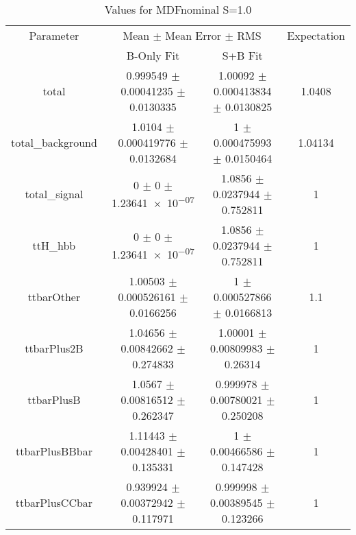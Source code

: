 \begin{table}
\centering
\caption{Values for MDFnominal S=1.0}
\begin{tabular}{cccc}
\toprule
Parameter & \multicolumn{2}{c}{Mean $\pm$ Mean Error $\pm$ RMS} & Expectation\\
 & B-Only Fit & S+B Fit & \\
\midrule
total & \num{0.999549} $\pm$ \num{0.00041235} $\pm$ \num{0.0130335} & \num{1.00092} $\pm$ \num{0.000413834} $\pm$ \num{0.0130825} & \num{1.0408}\\
total\_background & \num{1.0104} $\pm$ \num{0.000419776} $\pm$ \num{0.0132684} & \num{1} $\pm$ \num{0.000475993} $\pm$ \num{0.0150464} & \num{1.04134}\\
total\_signal & \num{0} $\pm$ \num{0} $\pm$ \num{1.23641e-07} & \num{1.0856} $\pm$ \num{0.0237944} $\pm$ \num{0.752811} & \num{1}\\
ttH\_hbb & \num{0} $\pm$ \num{0} $\pm$ \num{1.23641e-07} & \num{1.0856} $\pm$ \num{0.0237944} $\pm$ \num{0.752811} & \num{1}\\
ttbarOther & \num{1.00503} $\pm$ \num{0.000526161} $\pm$ \num{0.0166256} & \num{1} $\pm$ \num{0.000527866} $\pm$ \num{0.0166813} & \num{1.1}\\
ttbarPlus2B & \num{1.04656} $\pm$ \num{0.00842662} $\pm$ \num{0.274833} & \num{1.00001} $\pm$ \num{0.00809983} $\pm$ \num{0.26314} & \num{1}\\
ttbarPlusB & \num{1.0567} $\pm$ \num{0.00816512} $\pm$ \num{0.262347} & \num{0.999978} $\pm$ \num{0.00780021} $\pm$ \num{0.250208} & \num{1}\\
ttbarPlusBBbar & \num{1.11443} $\pm$ \num{0.00428401} $\pm$ \num{0.135331} & \num{1} $\pm$ \num{0.00466586} $\pm$ \num{0.147428} & \num{1}\\
ttbarPlusCCbar & \num{0.939924} $\pm$ \num{0.00372942} $\pm$ \num{0.117971} & \num{0.999998} $\pm$ \num{0.00389545} $\pm$ \num{0.123266} & \num{1}\\
\bottomrule
\end{tabular}
\end{table}